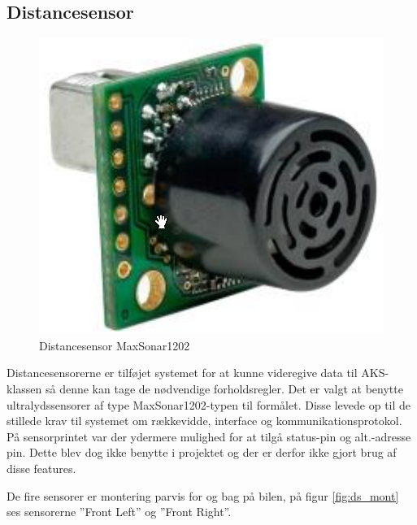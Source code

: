 \subsection{Distancesensor}

\begin{figure}[ht]
	\centering
	\includegraphics[scale=0.4]{../fig/billeder/distancesensor.png}
	\caption{Distancesensor MaxSonar1202}
	\label{fig:ds_pic}
\end{figure}

Distancesensorerne er tilføjet systemet for at kunne videregive data til AKS-klassen så denne kan tage de nødvendige forholdsregler. 
Det er valgt at benytte ultralydssensorer af type MaxSonar1202-typen \cite{lib:maxsonar} til formålet. 
Disse levede op til de stillede krav til systemet om rækkevidde, interface og kommunikationsprotokol.
På sensorprintet var der ydermere mulighed for at tilgå status-pin og alt.-adresse pin. Dette blev dog ikke benytte i projektet og der er derfor ikke gjort brug af disse features.

De fire sensorer er montering parvis for og bag på bilen, på figur \ref{fig:ds_mont} ses sensorerne ''Front Left'' og ''Front Right''. 

